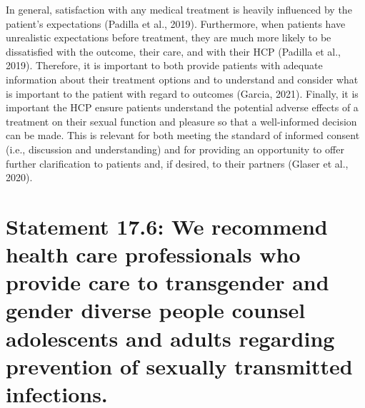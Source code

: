 \documentclass[
]{book}
\begin{document}
In general, satisfaction with any medical treatment is heavily influenced by the patient's
expectations (Padilla et al., 2019). Furthermore,
when patients have unrealistic expectations
before treatment, they are much more likely to
be dissatisfied with the outcome, their care, and
with their HCP (Padilla et al., 2019). Therefore,
it is important to both provide patients with
adequate information about their treatment
options and to understand and consider what
is important to the patient with regard to outcomes (Garcia, 2021). Finally, it is important
the HCP ensure patients understand the potential adverse effects of a treatment on their sexual
function and pleasure so that a well-informed
decision can be made. This is relevant for both
meeting the standard of informed consent (i.e.,
discussion and understanding) and for providing
an opportunity to offer further clarification to
patients and, if desired, to their partners (Glaser
et al., 2020).

\hypertarget{statement-17.6-we-recommend-health-care-professionals-who-provide-care-to-transgender-and-gender-diverse-people-counsel-adolescents-and-adults-regarding-prevention-of-sexually-transmitted-infections.}{%
\section*{Statement 17.6: We recommend health care professionals who provide care to transgender and gender diverse people counsel adolescents and adults regarding prevention of sexually transmitted infections.}\label{statement-17.6-we-recommend-health-care-professionals-who-provide-care-to-transgender-and-gender-diverse-people-counsel-adolescents-and-adults-regarding-prevention-of-sexually-transmitted-infections.}}
\end{document}
